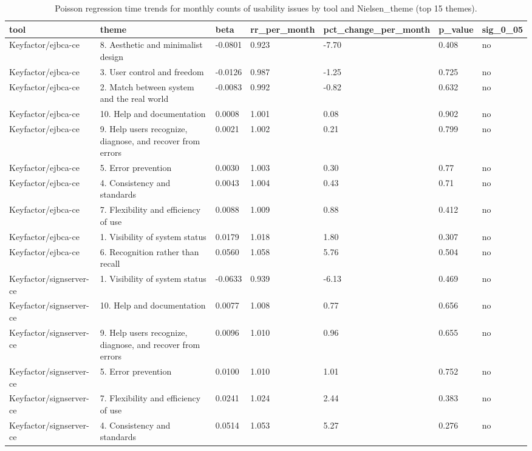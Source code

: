 \begin{table}[t]
\centering
\caption{Poisson regression time trends for monthly counts of usability issues by tool and Nielsen_theme (top 15 themes).}
\label{tab:poisson-nielsen_theme}
\scriptsize
\begin{tabular}{lllllll}
\hline
tool & theme & beta & rr\_per\_month & pct\_change\_per\_month & p\_value & sig\_0\_05 \\
\hline
Keyfactor/ejbca-ce & 8. Aesthetic and minimalist design & -0.0801 & 0.923 & -7.70 & 0.408 & no \\
Keyfactor/ejbca-ce & 3. User control and freedom & -0.0126 & 0.987 & -1.25 & 0.725 & no \\
Keyfactor/ejbca-ce & 2. Match between system and the real world & -0.0083 & 0.992 & -0.82 & 0.632 & no \\
Keyfactor/ejbca-ce & 10. Help and documentation & 0.0008 & 1.001 & 0.08 & 0.902 & no \\
Keyfactor/ejbca-ce & 9. Help users recognize, diagnose, and recover from errors & 0.0021 & 1.002 & 0.21 & 0.799 & no \\
Keyfactor/ejbca-ce & 5. Error prevention & 0.0030 & 1.003 & 0.30 & 0.77 & no \\
Keyfactor/ejbca-ce & 4. Consistency and standards & 0.0043 & 1.004 & 0.43 & 0.71 & no \\
Keyfactor/ejbca-ce & 7. Flexibility and efficiency of use & 0.0088 & 1.009 & 0.88 & 0.412 & no \\
Keyfactor/ejbca-ce & 1. Visibility of system status & 0.0179 & 1.018 & 1.80 & 0.307 & no \\
Keyfactor/ejbca-ce & 6. Recognition rather than recall & 0.0560 & 1.058 & 5.76 & 0.504 & no \\
Keyfactor/signserver-ce & 1. Visibility of system status & -0.0633 & 0.939 & -6.13 & 0.469 & no \\
Keyfactor/signserver-ce & 10. Help and documentation & 0.0077 & 1.008 & 0.77 & 0.656 & no \\
Keyfactor/signserver-ce & 9. Help users recognize, diagnose, and recover from errors & 0.0096 & 1.010 & 0.96 & 0.655 & no \\
Keyfactor/signserver-ce & 5. Error prevention & 0.0100 & 1.010 & 1.01 & 0.752 & no \\
Keyfactor/signserver-ce & 7. Flexibility and efficiency of use & 0.0241 & 1.024 & 2.44 & 0.383 & no \\
Keyfactor/signserver-ce & 4. Consistency and standards & 0.0514 & 1.053 & 5.27 & 0.276 & no \\

\end{tabular}
\end{table}
